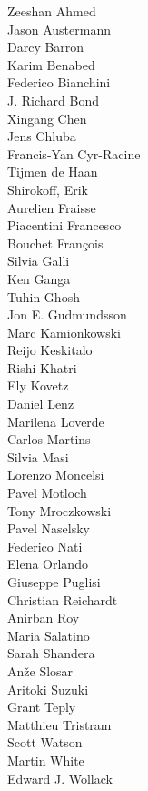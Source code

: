 \documentclass[PICOReport.tex]{subfiles}
\begin{document}
\footnotesize {

\begin{multicols}{4}
Zeeshan Ahmed    \\
Jason Austermann    \\
Darcy Barron    \\
Karim Benabed    \\
Federico Bianchini    \\
J. Richard Bond    \\
Xingang Chen    \\
Jens Chluba    \\
Francis-Yan Cyr-Racine    \\
Tijmen de Haan    \\
Shirokoff, Erik    \\
Aurelien Fraisse    \\
Piacentini Francesco    \\
Bouchet François    \\
Silvia Galli    \\
Ken Ganga    \\
Tuhin Ghosh    \\
Jon E. Gudmundsson    \\
Marc Kamionkowski    \\
Reijo Keskitalo    \\
Rishi Khatri    \\
Ely Kovetz    \\
Daniel Lenz    \\
Marilena Loverde    \\
Carlos Martins    \\
Silvia Masi    \\
Lorenzo Moncelsi    \\
Pavel Motloch    \\
Tony Mroczkowski    \\
Pavel Naselsky    \\
Federico Nati    \\
Elena Orlando    \\
Giuseppe Puglisi    \\
Christian Reichardt    \\
Anirban Roy    \\
Maria Salatino    \\
Sarah Shandera    \\
An\v{z}e Slosar    \\
Aritoki Suzuki    \\
Grant Teply    \\
Matthieu Tristram    \\
Scott Watson    \\
Martin White    \\
Edward J. Wollack    
\end{multicols}

}
\end{document}

